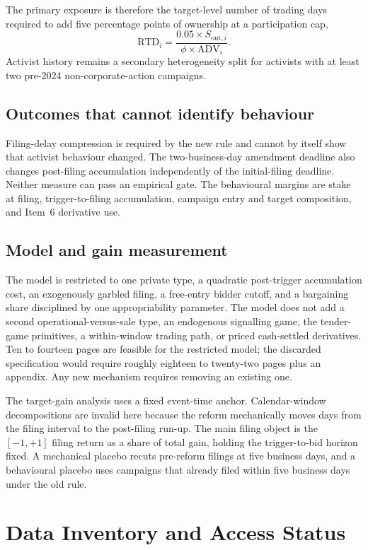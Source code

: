 The primary exposure is therefore the target-level number of trading days
required to add five percentage points of ownership at a participation cap,
\[
\mathrm{RTD}_i
=\frac{0.05\times S_{\mathrm{out},i}}
       {\phi\times\mathrm{ADV}_i}.
\]
Activist history remains a secondary heterogeneity split for activists with at
least two pre-2024 non-corporate-action campaigns.

\subsection{Outcomes that cannot identify behaviour}

Filing-delay compression is required by the new rule and cannot by itself show
that activist behaviour changed. The two-business-day amendment deadline also
changes post-filing accumulation independently of the initial-filing deadline.
Neither measure can pass an empirical gate. The behavioural margins are stake
at filing, trigger-to-filing accumulation, campaign entry and target
composition, and Item~6 derivative use.

\subsection{Model and gain measurement}

The model is restricted to one private type, a quadratic post-trigger
accumulation cost, an exogenously garbled filing, a free-entry bidder cutoff,
and a bargaining share disciplined by one appropriability parameter. The model
does not add a second operational-versus-sale type, an endogenous signalling
game, the tender-game primitives, a within-window trading path, or priced
cash-settled derivatives. Ten to fourteen pages are feasible for the restricted
model; the discarded specification would require roughly eighteen to
twenty-two pages plus an appendix. Any new mechanism requires removing an
existing one.

The target-gain analysis uses a fixed event-time anchor. Calendar-window
decompositions are invalid here because the reform mechanically moves days from
the filing interval to the post-filing run-up. The main filing object is the
$[-1,+1]$ filing return as a share of total gain, holding the trigger-to-bid
horizon fixed. A mechanical placebo recuts pre-reform filings at five business
days, and a behavioural placebo uses campaigns that already filed within five
business days under the old rule.

\section{Data Inventory and Access Status}
\label{sec:plan-data}

